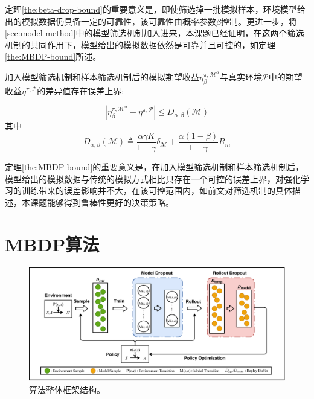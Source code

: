 定理\ref{the:beta-drop-bound}的重要意义是，即使筛选掉一批模拟样本，环境模型给出的模拟数据仍具备一定的可靠性，该可靠性由概率参数$\beta$控制。更进一步，将\ref{sec:model-method}中的模型筛选机制加入进来，本课题已经证明，在这两个筛选机制的共同作用下，模型给出的模拟数据依然是可靠并且可控的，如定理\ref{the:MBDP-bound}所述。

\begin{theorem}\label{the:MBDP-bound}

加入模型筛选机制和样本筛选机制后的模拟期望收益$\eta_\beta^{\pi, \mathcal{M}^\alpha}$与真实环境$\mathcal{P}$中的期望收益$\eta^{\pi, \mathcal{P}}$的差异值存在误差上界:

\begin{equation}
\left|\eta_\beta^{\pi, \mathcal{M}^\alpha}-\eta^{\pi, \mathcal{P}}\right|\leq D_{\alpha,\beta}(\mathcal{M})
\end{equation}
其中
\begin{equation}\label{eq:MBDP-bound}
D_{\alpha,\beta}(\mathcal{M})\triangleq\frac{\alpha\gamma K}{1-\gamma}\delta_{\mathcal{M}}+\frac{\alpha (1-\beta)}{1-\gamma}R_{m}
\end{equation}

\end{theorem}

定理\ref{the:MBDP-bound}的重要意义是，在加入模型筛选机制和样本筛选机制后，模型给出的模拟数据与传统的模拟方式相比只存在一个可控的误差上界，对强化学习的训练带来的误差影响并不大，在该可控范围内，如前文对筛选机制的具体描述，本课题能够得到鲁棒性更好的决策策略。

\section{MBDP算法}

\begin{figure}[tbh]
\centering
\includegraphics[width=\textwidth]{figures/mbdp.pdf}
\caption{算法整体框架结构。}
\label{fig:algo-structure}
\end{figure}

